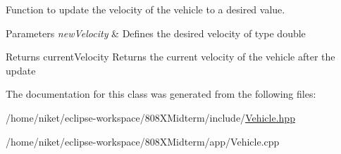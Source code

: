 Function to update the velocity of the vehicle to a desired value. 


\begin{DoxyParams}{Parameters}
{\em new\+Velocity} & Defines the desired velocity of type double \\
\hline
\end{DoxyParams}
\begin{DoxyReturn}{Returns}
current\+Velocity Returns the current velocity of the vehicle after the update 
\end{DoxyReturn}


The documentation for this class was generated from the following files\+:\begin{DoxyCompactItemize}
\item 
/home/niket/eclipse-\/workspace/808\+X\+Midterm/include/\mbox{\hyperlink{Vehicle_8hpp}{Vehicle.\+hpp}}\item 
/home/niket/eclipse-\/workspace/808\+X\+Midterm/app/Vehicle.\+cpp\end{DoxyCompactItemize}
